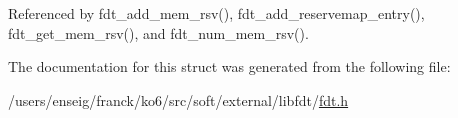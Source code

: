 Referenced by fdt\-\_\-add\-\_\-mem\-\_\-rsv(), fdt\-\_\-add\-\_\-reservemap\-\_\-entry(), fdt\-\_\-get\-\_\-mem\-\_\-rsv(), and fdt\-\_\-num\-\_\-mem\-\_\-rsv().



The documentation for this struct was generated from the following file\-:\begin{DoxyCompactItemize}
\item 
/users/enseig/franck/ko6/src/soft/external/libfdt/\hyperlink{fdt_8h}{fdt.\-h}\end{DoxyCompactItemize}
